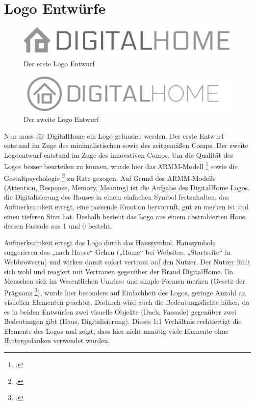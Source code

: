 \section{Logo Entwürfe}
\begin{figure} [tp]
\includegraphics[width=\textwidth]{./img/logo1.png}
\caption{Der erste Logo Entwurf}
\label{logo1}
\end{figure}
\begin{figure} [tp]
\includegraphics[width=\textwidth]{./img/logo2.png}
\caption{Der zweite Logo Entwurf}
\label{logo2}
\end{figure}
Nun muss für DigitalHome ein Logo gefunden werden. Der erste Entwurf entstand im Zuge des minimalistischen sowie des zeitgemäßen Comps. Der zweite Logoentwurf entstand im Zuge des innovativen Comps. Um die Qualität des Logos besser beurteilen zu können, wurde hier das ARMM-Modell \footcite[vgl.][]{ARMM:model} sowie die Gestaltpsychologie \footcite[vgl.][]{gestalt} zu Rate gezogen. Auf Grund des ARMM-Modells (Attention, Response, Memory, Meaning) ist die Aufgabe des DigitalHome Logos, die Digitalisierung des Hauses in einem einfachen Symbol festzuhalten, das Aufmerksamkeit erregt, eine passende Emotion hervorruft, gut zu merken ist und einen tieferen Sinn hat. Deshalb besteht das Logo aus einem abstrahierten Haus, dessen Fassade aus 1 und 0 besteht.

Aufmerksamkeit erregt das Logo durch das Haussymbol. Haussymbole suggerieren das „nach Hause“ Gehen („Home“ bei Websites, „Startseite“ in Webbrowsern) und wirken damit sofort vertraut auf den Nutzer. Der Nutzer fühlt sich wohl und reagiert mit Vertrauen gegenüber der Brand DigitalHome. Da Menschen sich im Wesentlichen Umrisse und simple Formen merken (Gesetz der Prägnanz \footcite[vgl.][]{gestalt}), wurde hier besonders auf Einfachheit des Logos, geringe Anzahl an visuellen Elementen geachtet. Dadurch wird auch die Bedeutungsdichte höher, da es in beiden Entwürfen zwei visuelle Objekte (Dach, Fassade) gegenüber zwei Bedeutungen gibt (Haus, Digitalisierung). Dieses 1:1 Verhältnis rechtfertigt die Elemente des Logos und zeigt, dass hier nicht unnötig viele Elemente ohne Hintergedanken verwendet wurden.

